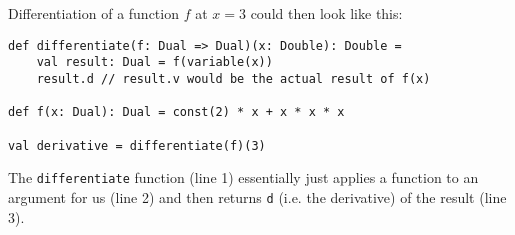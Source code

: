 Differentiation of a function $f$ at $x = 3$ could then look like this:
\begin{lstlisting}[caption={Differentiation of a dual number function}, label={lst:forwardDualNumberDiff}]
def differentiate(f: Dual => Dual)(x: Double): Double =
    val result: Dual = f(variable(x))
    result.d // result.v would be the actual result of f(x)

def f(x: Dual): Dual = const(2) * x + x * x * x

val derivative = differentiate(f)(3)
\end{lstlisting}
The \lstinline{differentiate} function (line 1) essentially just applies a function to an argument for us (line 2) and then returns \lstinline{d} (i.e. the derivative) of the result (line 3).



